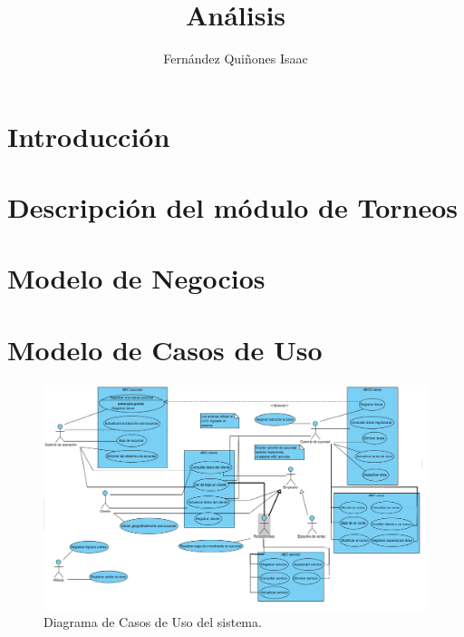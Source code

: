 \documentclass[oneside,10pt]{book}
\title{Análisis}
\subtitle{}
\author{Fernández Quiñones Isaac}
\begin{document}
\maketitle
\thispagestyle{empty}

\frontmatter
\tableofcontents

\mainmatter

\chapter{Introducción}


\chapter{Descripción del módulo de Torneos}


\chapter{Modelo de Negocios}


\chapter{Modelo de Casos de Uso}

\begin{figure}[htbp!]
		\centering
			\includegraphics[width=1.2\textwidth]{images/CasosDeUso}
		\caption{Diagrama de Casos de Uso del sistema.}
	\end{figure}
	
\end{document}
